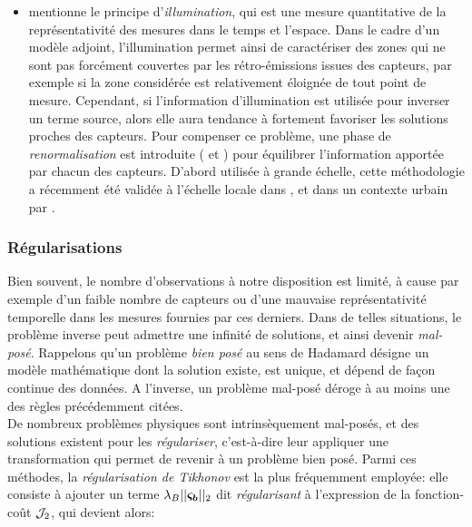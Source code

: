 \begin{itemize}
	 \item \cite{Issartel2005} mentionne le principe d'\textit{illumination}, qui est une mesure quantitative de la représentativité des mesures dans le temps et l'espace. Dans le cadre d'un modèle adjoint, l'illumination permet ainsi de caractériser des zones qui ne sont pas forcément couvertes par les rétro-émissions issues des capteurs, par exemple si la zone considérée est relativement éloignée {de tout point de mesure}. Cependant, si l'information d'illumination est utilisée pour inverser un terme source, alors elle aura tendance à fortement favoriser les solutions proches des capteurs. Pour compenser ce problème, une phase de \textit{renormalisation} est introduite (\cite{Issartel2007} et \cite{Sharan2009}) pour équilibrer l'information apportée par chacun des capteurs. D'abord utilisée à grande échelle, cette méthodologie a récemment été validée à l'échelle locale dans \cite{Singh2014}, et dans un contexte urbain par \cite{Kumar2015}. \\

\end{itemize}

\subsubsection{Régularisations}

Bien souvent, le nombre d'observations à notre disposition est limité, à cause par exemple d'un faible nombre de capteurs ou d'une mauvaise représentativité temporelle dans les mesures fournies par ces derniers. Dans de telles situations, le problème inverse peut admettre une infinité de solutions, et ainsi devenir \textit{mal-posé}. Rappelons qu'un problème \textit{bien posé} au sens de Hadamard \cite{Hadamard1902} désigne un modèle mathématique dont la solution existe, est unique, et dépend de façon continue des données. A l'inverse, un problème mal-posé déroge à au moins une des règles précédemment citées. \\

De nombreux problèmes physiques sont intrinsèquement mal-posés, et des solutions existent pour les \textit{régulariser}, c'est-à-dire leur appliquer une transformation qui permet de revenir à un problème bien posé. Parmi ces méthodes, la \textit{régularisation de Tikhonov} \cite{Tikhonov1963} est la plus fréquemment employée: elle consiste à ajouter un terme $\lambda_B ||{\bm{\varsigma_b}}||_2$ dit \textit{régularisant} à l'expression de la fonction-coût ${\mathcal{J}}_2$, qui devient alors:

